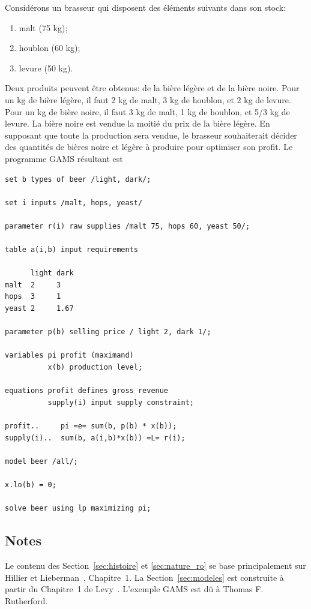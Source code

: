 Considérons un brasseur qui disposent des éléments suivants dans son stock:
\begin{enumerate}
\item
malt (75 kg);
\item
houblon (60 kg);
\item
levure (50 kg).
\end{enumerate}
Deux produits peuvent être obtenus: de la bière légère et de la bière noire.
Pour un kg de bière légère, il faut 2 kg de malt, 3 kg de houblon, et 2 kg de levure.
Pour un kg de bière noire, il faut 3 kg de malt, 1 kg de houblon, et 5/3 kg de levure.
La bière noire est vendue la moitié du prix de la bière légère.
En supposant que toute la production sera vendue, le brasseur souhaiterait décider des quantités de bières noire et légère à produire pour optimiser son profit.
Le programme GAMS résultant est
\begin{verbatim}
set b types of beer /light, dark/;

set i inputs /malt, hops, yeast/

parameter r(i) raw supplies /malt 75, hops 60, yeast 50/;

table a(i,b) input requirements

      light dark
malt  2     3
hops  3     1
yeast 2     1.67

parameter p(b) selling price / light 2, dark 1/;

variables pi profit (maximand)
          x(b) production level;

equations profit defines gross revenue
          supply(i) input supply constraint;

profit..     pi =e= sum(b, p(b) * x(b));
supply(i)..  sum(b, a(i,b)*x(b)) =L= r(i);

model beer /all/;

x.lo(b) = 0;

solve beer using lp maximizing pi;
\end{verbatim}

\begin{small}
\section{Notes}

Le contenu des Section~\ref{sec:histoire} et \ref{sec:nature_ro} se base principalement sur Hillier et Lieberman~\cite{HillLieb01}, Chapitre~1. La Section~\ref{sec:modeles} est construite à partir du Chapitre~1 de Levy~\cite{Levy09}. L'exemple GAMS est dû à Thomas F. Rutherford.

\end{small}
